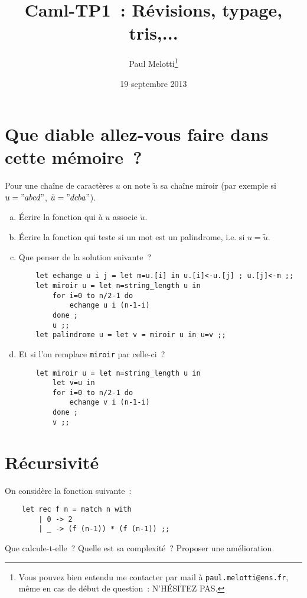 \documentclass[10pt,a4paper]{article}
\begin{document}
\title{Caml-TP1~: Révisions, typage, tris,...}
\author{Paul Melotti\footnote{Vous pouvez bien entendu me contacter par mail à \texttt{paul.melotti@ens.fr}, même en cas de début de question~: N'HÉSITEZ PAS.}}
\date{19 septembre 2013}
\maketitle{}

\section{Que diable allez-vous faire dans cette mémoire~?}
Pour une chaîne de caractères $u$ on note $\tilde{u}$ sa chaîne miroir (par exemple si $u = "abcd"$, $\tilde{u} = "dcba"$).
\begin{enumerate}[a)]
\item Écrire la fonction qui à $u$ associe $\tilde{u}$.

\item Écrire la fonction qui teste si un mot est un palindrome, i.e. si $u = \tilde{u}$.

\item Que penser de la solution suivante~?
\begin{verbatim}    let echange u i j = let m=u.[i] in u.[i]<-u.[j] ; u.[j]<-m ;;
    let miroir u = let n=string_length u in
        for i=0 to n/2-1 do
            echange u i (n-1-i)
        done ;
        u ;;
    let palindrome u = let v = miroir u in u=v ;;    
\end{verbatim}

\item Et si l'on remplace \texttt{miroir} par celle-ci~?
\begin{verbatim}    let miroir u = let n=string_length u in
        let v=u in
        for i=0 to n/2-1 do
            echange v i (n-1-i)
        done ;
        v ;;   
\end{verbatim}
\end{enumerate}

\section{Récursivité}
On considère la fonction suivante~:
\begin{verbatim}    let rec f n = match n with
        | 0 -> 2
        | _ -> (f (n-1)) * (f (n-1)) ;;\end{verbatim}
Que calcule-t-elle~? Quelle est sa complexité~? Proposer une amélioration.
\end{document}
